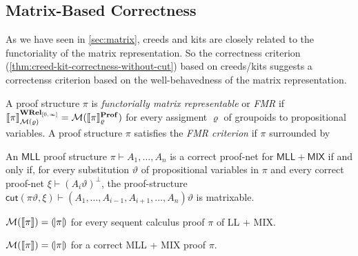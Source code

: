\subsection{Matrix-Based Correctness}
As we have seen in \cref{sec:matrix}, creeds and kits are closely related to the functoriality of the matrix representation.
So the correctness criterion (\cref{thm:creed-kit-correctness-without-cut}) based on creeds/kits suggests a correctenss criterion based on the well-behavedness of the matrix representation.

\begin{definition}
    A proof structure \( \pi \) is \emph{functorially matrix representable} or \emph{FMR} if \( \llbracket{\pi}\rrbracket_{\mathcal{M}({\varrho})}^{\mathbf{WRel}_{[0,\infty]}} = \mathcal{M}({\llbracket{\pi}\rrbracket_{\varrho}^{\mathbf{Prof}}}) \) for every assigment \( \varrho \) of groupoids to propositional variables.
    A proof structure \( \pi \) satisfies the \emph{FMR criterion} if \( \pi \) surrounded by 
\end{definition}

\begin{theorem}
    An \(\mathsf{MLL}\) proof structure \( \pi \vdash A_1, \dots, A_n \) is a correct proof-net for \( \mathsf{MLL+MIX} \) if and only if, for every substitution \( \vartheta \) of propositional variables in \( \pi \) and every correct proof-net \( \xi \vdash (A_i\vartheta)^{\bot} \), the proof-structure \( \mathsf{cut}(\pi\vartheta, \xi) \vdash (A_1, \dots, A_{i-1}, A_{i+1}, \dots, A_n)\vartheta \) is matrixable. 
\end{theorem}

\begin{corollary}
    \( \mathcal{M}({\llbracket{\pi}\rrbracket}) = (\!|{\pi}|\!) \) for every sequent calculus proof \( \pi \) of LL + MIX.
\end{corollary}
\begin{corollary}
    \( \mathcal{M}({\llbracket{\pi}\rrbracket}) = (\!|{\pi}|\!) \) for a correct MLL + MIX proof \( \pi \). 
\end{corollary}

